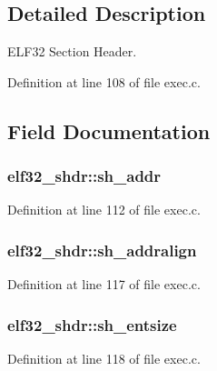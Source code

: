 \subsection{Detailed Description}
E\+L\+F32 Section Header. 

Definition at line 108 of file exec.\+c.



\subsection{Field Documentation}
\hypertarget{structelf32__shdr_a7054ce2ce815d205d451bfe7ce2e145e}{
\subsubsection[{sh\+\_\+addr}]{ elf32\+\_\+shdr\+::sh\+\_\+addr}}\label{structelf32__shdr_a7054ce2ce815d205d451bfe7ce2e145e}


Definition at line 112 of file exec.\+c.

\hypertarget{structelf32__shdr_a74275f49dbae08127832dc1061ed24ab}{
\subsubsection[{sh\+\_\+addralign}]{ elf32\+\_\+shdr\+::sh\+\_\+addralign}}\label{structelf32__shdr_a74275f49dbae08127832dc1061ed24ab}


Definition at line 117 of file exec.\+c.

\hypertarget{structelf32__shdr_a0360b455d1586deda50df0adaa7a87e0}{
\subsubsection[{sh\+\_\+entsize}]{ elf32\+\_\+shdr\+::sh\+\_\+entsize}}\label{structelf32__shdr_a0360b455d1586deda50df0adaa7a87e0}


Definition at line 118 of file exec.\+c.


